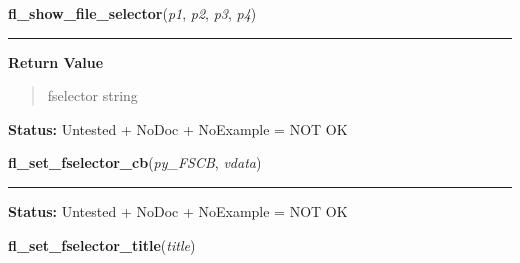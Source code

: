 \hspace{.8\funcindent}\begin{boxedminipage}{\funcwidth}

    \raggedright \textbf{fl\_show\_file\_selector}(\textit{p1}, \textit{p2}, \textit{p3}, \textit{p4})

    \vspace{-1.5ex}

    \rule{\textwidth}{0.5\fboxrule}
\setlength{\parskip}{2ex}
\setlength{\parskip}{1ex}
      \textbf{Return Value}
    \vspace{-1ex}

      \begin{quote}
      fselector string

      \end{quote}

\textbf{Status:} Untested + NoDoc + NoExample = NOT OK



    \end{boxedminipage}

    \label{xformslib:library:fl_set_fselector_callback}

    \vspace{0.5ex}

\hspace{.8\funcindent}\begin{boxedminipage}{\funcwidth}

    \raggedright \textbf{fl\_set\_fselector\_cb}(\textit{py\_FSCB}, \textit{vdata})

    \vspace{-1.5ex}

    \rule{\textwidth}{0.5\fboxrule}
\setlength{\parskip}{2ex}
\setlength{\parskip}{1ex}
\textbf{Status:} Untested + NoDoc + NoExample = NOT OK



    \end{boxedminipage}

    \label{xformslib:library:fl_set_fselector_title}

    \vspace{0.5ex}

\hspace{.8\funcindent}\begin{boxedminipage}{\funcwidth}

    \raggedright \textbf{fl\_set\_fselector\_title}(\textit{title})

\setlength{\parskip}{2ex}
\setlength{\parskip}{1ex}
    \end{boxedminipage}

